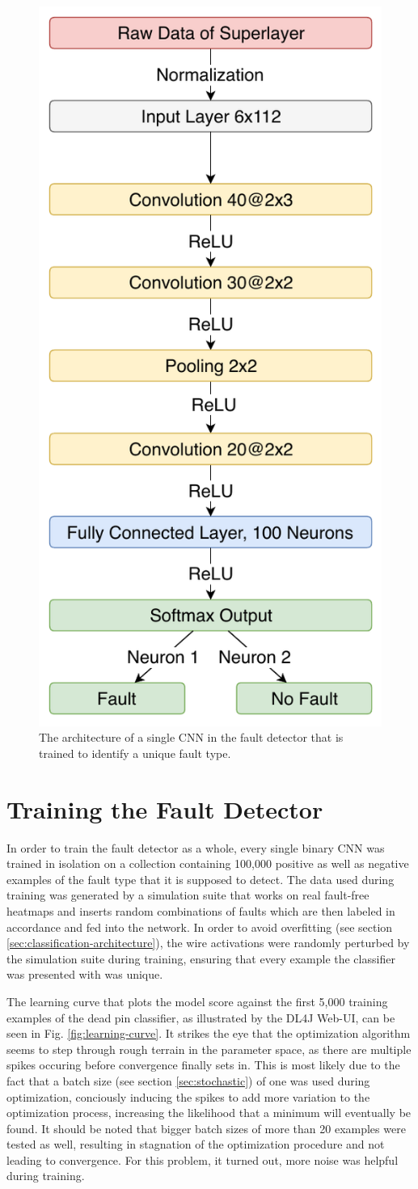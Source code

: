 \begin{figure}[h]
  \centering
  \includegraphics[width=.4\textwidth]{../figures/fault_architecture}
  \caption{The architecture of a single CNN in the fault detector that
  is trained to identify a unique fault type.}
  \label{fig:fault-architecture}
\end{figure}

\section{Training the Fault Detector}

In order to train the fault detector as a whole, every single binary
CNN was trained in isolation on a collection containing 100,000
positive as well as negative examples of the fault type that it is
supposed to detect. The data used during training was
generated by a simulation suite that works on real fault-free heatmaps
and inserts random combinations of faults which are then labeled in
accordance and fed into the network. In order to avoid overfitting
(see section \ref{sec:classification-architecture}), the wire activations
were randomly perturbed by the simulation suite during training,
ensuring that every example the classifier was presented with was
unique.

The learning curve that plots the model score against the
first 5,000 training examples of the dead pin classifier, as
illustrated by the DL4J Web-UI, can be seen in
Fig. \ref{fig:learning-curve}. It strikes the eye that the
optimization algorithm seems to step through
rough terrain in the parameter space, as there are multiple spikes
occuring before convergence finally sets in. This is most likely due
to the fact that a batch size (see section \ref{sec:stochastic}) of
one was used during optimization, conciously inducing the spikes to
add more variation to the optimization process, increasing
the likelihood that a minimum will eventually be found. It should be
noted that bigger batch sizes of more than 20 examples were tested as
well, resulting in stagnation of the optimization procedure and not
leading to convergence. For this problem, it turned out, more noise
was helpful during training.

